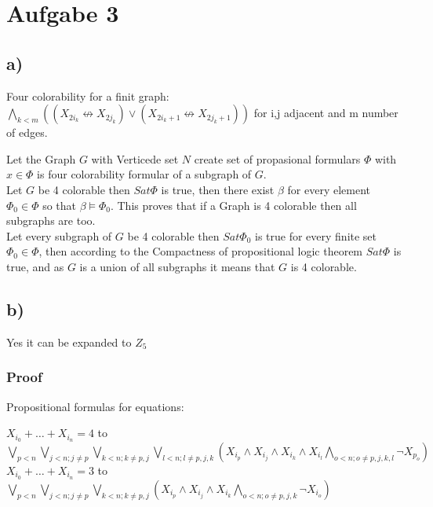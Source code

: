 \section*{Aufgabe 3}

\subsection*{a)}
Four colorability for a finit graph:\\
$\bigwedge_{k<m}((X_{2i_k} \not \leftrightarrow X_{2j_k}) \vee (X_{2i_k +1 } \not\leftrightarrow X_{2j_k +1}))$ for i,j adjacent and m number of edges.


Let the Graph $G$ with Verticede set $N$ create set of propasional formulars $\Phi$ with $x \in \Phi$ is four colorability formular of a subgraph of $G$.\\
Let $G$ be 4 colorable then $ Sat \Phi$ is true, then there exist $\beta$ for every element $\Phi_0 \in \Phi$ so that $\beta \vDash \Phi_0$. This proves that if a Graph is 4 colorable then all subgraphs are too.\\
Let every subgraph of $G$ be 4 colorable then $ Sat \Phi_0$ is true for every finite set  $\Phi_0 \in \Phi$, then according to the Compactness of propositional logic theorem $ Sat \Phi$ is true, and as $G$ is a union of all subgraphs it means that $G$ is 4 colorable.

\subsection*{b)}

Yes it can be expanded to $Z_5$

\subsubsection*{Proof} 
Propositional formulas for equations:

$X_{i_0} + \ldots + X_{i_n} = 4$ to \\
$\bigvee_{p<n} \bigvee_{j<n;  j\neq p} \bigvee_{k<n;  k\neq p,j} \bigvee_{l<n;  l\neq p,j,k}  (X_{i_p} \wedge X_{i_j} \wedge X_{i_k} \wedge X_{i_l} \bigwedge_{o<n;  o\neq p,j,k,l} \neg X_{p_o} )$\\

$X_{i_0} + \ldots + X_{i_n} = 3$ to \\
$\bigvee_{p<n} \bigvee_{j<n;  j\neq p} \bigvee_{k<n;  k\neq p,j} (X_{i_p} \wedge X_{i_j} \wedge X_{i_k} \bigwedge_{o<n;  o\neq p,j,k} \neg X_{i_o} )$\\

